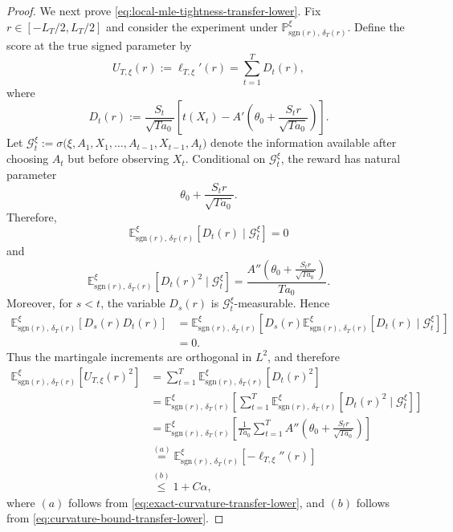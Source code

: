 \documentclass[10pt]{article}
\theoremstyle{plain}
\begin{document}
\begin{proof}
We next prove \eqref{eq:local-mle-tightness-transfer-lower}. Fix
$r\in[-L_T/2,L_T/2]$ and consider the experiment under
$\mathbb P_{\mathrm{sgn}(r),\,\delta_T(r)}^\xi$. Define the score at the true signed
parameter by
\[
    U_{T,\xi}(r)
    :=
    \ell_{T,\xi}'(r)
    =
    \sum_{t=1}^T D_t(r),
\]
where
\[
    D_t(r)
    :=
    \frac{S_t}{\sqrt{Ta_0}}
    \left[
        t(X_t)
        -
        A'\left(
            \theta_0+
            \frac{S_t r}{\sqrt{Ta_0}}
        \right)
    \right].
\]
Let
    $\mathcal G_t^\xi
    :=
    \sigma\bigl(
        \xi,A_1,X_1,\ldots,A_{t-1},X_{t-1},A_t
    \bigr)$
denote the information available after choosing $A_t$ but before observing
$X_t$. Conditional on $\mathcal G_t^\xi$, the reward has natural parameter
\[
    \theta_0+\frac{S_t r}{\sqrt{Ta_0}}.
\]
Therefore,
\[
    \mathbb E_{\mathrm{sgn}(r),\,\delta_T(r)}^\xi
    \left[
        D_t(r)\mid\mathcal G_t^\xi
    \right]
    =
    0
\]
and
\[
    \mathbb E_{\mathrm{sgn}(r),\,\delta_T(r)}^\xi
    \left[
        D_t(r)^2\mid\mathcal G_t^\xi
    \right]
    =
    \frac{
        A''\left(
            \theta_0+
            \frac{S_t r}{\sqrt{Ta_0}}
        \right)
    }{
        Ta_0
    }.
\]
Moreover, for $s<t$, the variable $D_s(r)$ is
$\mathcal G_t^\xi$-measurable. Hence
\[
\begin{aligned}
    \mathbb E_{\mathrm{sgn}(r),\,\delta_T(r)}^\xi
    \left[
        D_s(r)D_t(r)
    \right]
    &=
    \mathbb E_{\mathrm{sgn}(r),\,\delta_T(r)}^\xi
    \left[
        D_s(r)
        \mathbb E_{\mathrm{sgn}(r),\,\delta_T(r)}^\xi
        \left[
            D_t(r)\mid\mathcal G_t^\xi
        \right]
    \right]\\
    &=0.
\end{aligned}
\]
Thus the martingale increments are orthogonal in $L^2$, and therefore
\[
\begin{aligned}
    \mathbb E_{\mathrm{sgn}(r),\,\delta_T(r)}^\xi
    \left[
        U_{T,\xi}(r)^2
    \right]
    &=
    \sum_{t=1}^T
    \mathbb E_{\mathrm{sgn}(r),\,\delta_T(r)}^\xi
    \left[
        D_t(r)^2
    \right]\\
    &=
    \mathbb E_{\mathrm{sgn}(r),\,\delta_T(r)}^\xi
    \left[
        \sum_{t=1}^T
        \mathbb E_{\mathrm{sgn}(r),\,\delta_T(r)}^\xi
        \left[
            D_t(r)^2\mid\mathcal G_t^\xi
        \right]
    \right]\\
    &=
    \mathbb E_{\mathrm{sgn}(r),\,\delta_T(r)}^\xi
    \left[
        \frac{1}{Ta_0}
        \sum_{t=1}^T
        A''\left(
            \theta_0+
            \frac{S_t r}{\sqrt{Ta_0}}
        \right)
    \right]\\
    &\stackrel{(a)}{=} 
    \mathbb E_{\mathrm{sgn}(r),\,\delta_T(r)}^\xi
    \left[
        -\ell_{T,\xi}''(r)
    \right]\\
    &\stackrel{(b)}{\le} 
    1+C\alpha,
\end{aligned}
\]
where $(a)$ follows from
\eqref{eq:exact-curvature-transfer-lower}, and $(b)$ follows from \eqref{eq:curvature-bound-transfer-lower}.




\end{proof}
\end{document}
